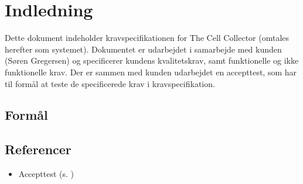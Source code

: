 \section{Indledning}
Dette dokument indeholder kravspecifikationen for The Cell Collector (omtales herefter som systemet). Dokumentet er udarbejdet i samarbejde med kunden (Søren Gregersen) og specificerer kundens kvalitetskrav, samt funktionelle og ikke funktionelle krav. Der er sammen med kunden udarbejdet en accepttest, som har til formål at teste de specificerede krav i kravspecifikation.
\subsection{Formål}

\subsection{Referencer}
\begin{itemize}
\item Accepttest (s. \pageref{ch:at})
\end{itemize}

